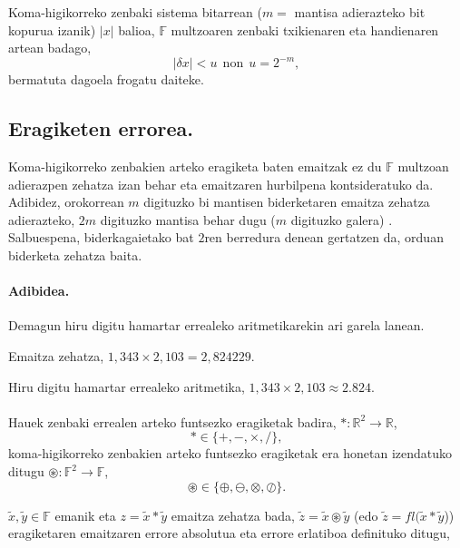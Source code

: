 Koma-higikorreko zenbaki sistema bitarrean ($m=$ mantisa adierazteko bit kopurua izanik) $|x|$ balioa, $\mathbb{F}$ multzoaren zenbaki txikienaren eta handienaren artean badago,
\begin{equation*}
 |\delta x|< u \ \ \text{non} \ \ u=2^{-m},
 \end{equation*}
bermatuta dagoela frogatu daiteke.

\subsection*{Eragiketen errorea.} 

Koma-higikorreko zenbakien arteko eragiketa baten emaitzak ez du $\mathbb{F}$ multzoan adierazpen zehatza izan behar eta emaitzaren hurbilpena kontsideratuko da. Adibidez, orokorrean $m$ digituzko bi mantisen biderketaren emaitza zehatza adierazteko, $2m$ digituzko mantisa behar dugu ($m$ digituzko galera) \cite{Fukushima2001}. Salbuespena, biderkagaietako bat $2$ren berredura denean gertatzen da, orduan biderketa zehatza baita.

\paragraph*{Adibidea.} Demagun hiru digitu hamartar errealeko aritmetikarekin ari garela lanean.

Emaitza zehatza, $1,343 \times 2,103 = 2,824229$. 

Hiru digitu hamartar errealeko aritmetika, $1,343 \times 2,103 \approx 2.824$.

\paragraph*{} Hauek zenbaki errealen arteko funtsezko eragiketak badira,  $\ast: \mathbb{R}^2\rightarrow \mathbb{R}$, 
\begin{equation*}
\ast\in \{+,-,\times,/ \},
\end{equation*}
koma-higikorreko zenbakien arteko funtsezko eragiketak era honetan izendatuko ditugu  $\circledast: \mathbb{F}^2\rightarrow \mathbb{F}$,
\begin{equation*}
\circledast\in \{\oplus,\ominus,\otimes,\oslash \}.
\end{equation*}

$\tilde x,\tilde y \in \mathbb{F}$ emanik eta $z= \tilde x \ast \tilde y$ emaitza zehatza bada, $\tilde z= \tilde x \circledast \tilde y$ (edo $\tilde z= fl(\tilde x \ast \tilde y$)) eragiketaren emaitzaren errore absolutua eta errore erlatiboa definituko ditugu,

